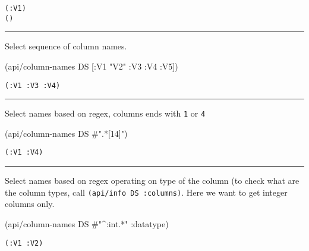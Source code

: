 \documentclass[]{article}
\newenvironment{Shaded}{\begin{snugshade}}{\end{snugshade}}
\newcommand{\StringTok}[1]{\textcolor[rgb]{0.31,0.60,0.02}{#1}}
\newcommand{\SpecialStringTok}[1]{\textcolor[rgb]{0.31,0.60,0.02}{#1}}
\newcommand{\AttributeTok}[1]{\textcolor[rgb]{0.77,0.63,0.00}{#1}}
\newcommand{\NormalTok}[1]{#1}
\begin{document}
\begin{verbatim}
(:V1)
()
\end{verbatim}

\begin{center}\rule{0.5\linewidth}{0.5pt}\end{center}

Select sequence of column names.

\begin{Shaded}
\begin{Highlighting}[]
\NormalTok{(api/column-names DS [}\AttributeTok{:V1} \StringTok{"V2"} \AttributeTok{:V3} \AttributeTok{:V4} \AttributeTok{:V5}\NormalTok{])}
\end{Highlighting}
\end{Shaded}

\begin{verbatim}
(:V1 :V3 :V4)
\end{verbatim}

\begin{center}\rule{0.5\linewidth}{0.5pt}\end{center}

Select names based on regex, columns ends with \texttt{1} or \texttt{4}

\begin{Shaded}
\begin{Highlighting}[]
\NormalTok{(api/column-names DS }\SpecialStringTok{#".*[14]"}\NormalTok{)}
\end{Highlighting}
\end{Shaded}

\begin{verbatim}
(:V1 :V4)
\end{verbatim}

\begin{center}\rule{0.5\linewidth}{0.5pt}\end{center}

Select names based on regex operating on type of the column (to check
what are the column types, call \texttt{(api/info\ DS\ :columns)}. Here
we want to get integer columns only.

\begin{Shaded}
\begin{Highlighting}[]
\NormalTok{(api/column-names DS }\SpecialStringTok{#"^:int.*"} \AttributeTok{:datatype}\NormalTok{)}
\end{Highlighting}
\end{Shaded}

\begin{verbatim}
(:V1 :V2)
\end{verbatim}
\end{document}
